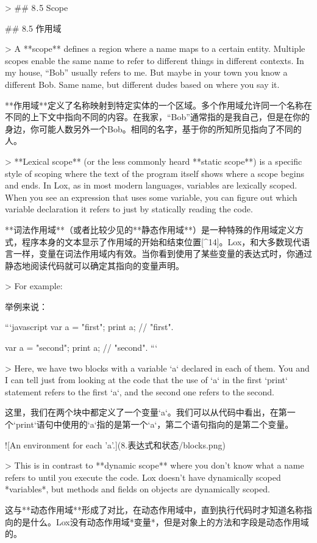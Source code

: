 \documentclass[cn,11pt,chinese]{elegantbook}
\begin{document}
{{{{{{{> ## 8 . 5 Scope

## 8.5 作用域

> A **scope** defines a region where a name maps to a certain entity. Multiple scopes enable the same name to refer to different things in different contexts. In my house, “Bob” usually refers to me. But maybe in your town you know a different Bob. Same name, but different dudes based on where you say it.

**作用域**定义了名称映射到特定实体的一个区域。多个作用域允许同一个名称在不同的上下文中指向不同的内容。在我家，“Bob”通常指的是我自己，但是在你的身边，你可能人数另外一个Bob。相同的名字，基于你的所知所见指向了不同的人。

> **Lexical scope** (or the less commonly heard **static scope**) is a specific style of scoping where the text of the program itself shows where a scope begins and ends. In Lox, as in most modern languages, variables are lexically scoped. When you see an expression that uses some variable, you can figure out which variable declaration it refers to just by statically reading the code.

**词法作用域**（或者比较少见的**静态作用域**）是一种特殊的作用域定义方式，程序本身的文本显示了作用域的开始和结束位置[^14]。Lox，和大多数现代语言一样，变量在词法作用域内有效。当你看到使用了某些变量的表达式时，你通过静态地阅读代码就可以确定其指向的变量声明。

> For example:

举例来说：

```javascript
{
  var a = "first";
  print a; // "first".
}

{
  var a = "second";
  print a; // "second".
}
```

> Here, we have two blocks with a variable `a` declared in each of them. You and I can tell just from looking at the code that the use of `a` in the first `print` statement refers to the first `a`, and the second one refers to the second.

这里，我们在两个块中都定义了一个变量`a`。我们可以从代码中看出，在第一个`print`语句中使用的`a`指的是第一个`a`，第二个语句指向的是第二个变量。

![An environment for each 'a'.](8.表达式和状态/blocks.png)

> This is in contrast to **dynamic scope** where you don’t know what a name refers to until you execute the code. Lox doesn’t have dynamically scoped *variables*, but methods and fields on objects are dynamically scoped.

这与**动态作用域**形成了对比，在动态作用域中，直到执行代码时才知道名称指向的是什么。Lox没有动态作用域*变量*，但是对象上的方法和字段是动态作用域的。

}}}}}}}
\end{document}
